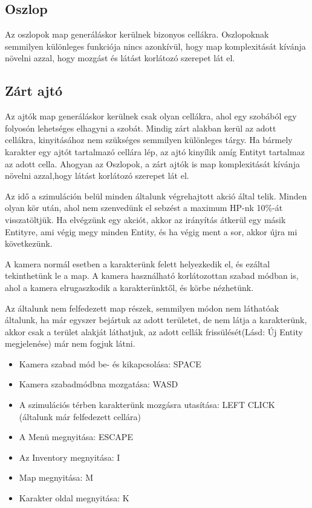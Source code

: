 \subsection{Oszlop}

Az oszlopok map generáláskor kerülnek bizonyos cellákra.
Oszlopoknak semmilyen különleges funkciója nincs azonkívül, hogy map komplexitását kívánja növelni azzal,
hogy mozgást és látást korlátozó szerepet lát el.

\subsection{Zárt ajtó}

Az ajtók map generáláskor kerülnek csak olyan cellákra, ahol egy szobából egy folyosón lehetséges elhagyni a szobát.
Mindig zárt alakban kerül az adott cellákra, kinyitásához nem szükséges semmilyen különleges tárgy. Ha bármely karakter egy ajtót tartalmazó cellára lép, az ajtó kinyílik amíg Entityt tartalmaz az adott cella.
Ahogyan az Oszlopok, a zárt ajtók is map komplexitását kívánja növelni azzal,hogy látást korlátozó szerepet lát el.


Az idő a szimuláción belül minden általunk végrehajtott akció által telik.
Minden olyan kör után, ahol nem szenvedünk el sebzést a maximum HP-nk 10\%-át visszatöltjük.
Ha elvégzünk egy akciót, akkor az irányítás átkerül egy másik Entityre,
ami végig megy minden Entity, és ha végig ment a sor, akkor újra mi következünk.


A kamera normál esetben a karakterünk felett helyezkedik el, és ezáltal tekinthetünk le a map.
A kamera használható korlátozottan szabad módban is, ahol a kamera elrugaszkodik a karakterünktől, és körbe nézhetünk.


Az általunk nem felfedezett map részek, semmilyen módon nem láthatóak általunk, ha már egyszer bejártuk az adott területet, 
de nem látja a karakterünk, akkor csak a terület alakját láthatjuk, az adott cellák frissülését(Lásd: Új Entity megjelenése) már nem fogjuk látni.


\begin{itemize}
    \item Kamera szabad mód be- és kikapcsolása: SPACE
    \item Kamera szabadmódbna mozgatása: WASD
    \item A szimulációs térben karakterünk mozgásra utasítása: LEFT CLICK (általunk már felfedezett cellára)
    \item A Menü megnyitása: ESCAPE
    \item Az Inventory megnyitása: I
    \item Map megnyitása: M
    \item Karakter oldal megnyitása: K
\end{itemize}

